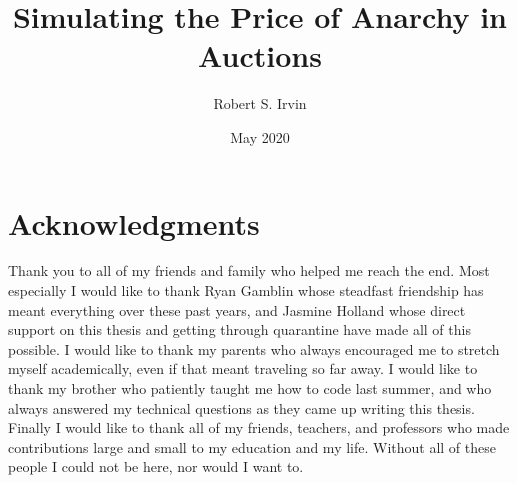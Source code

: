 \documentclass[12pt,twoside]{reedthesis}
\title{Simulating the Price of Anarchy in Auctions}
\author{Robert S. Irvin}
\date{May 2020}
\begin{document}
  \maketitle
  \frontmatter %
  \pagestyle{empty} %

    \chapter*{Acknowledgments}
	Thank you to all of my friends and family who helped me reach the end. Most especially I would like to thank Ryan Gamblin whose steadfast friendship has meant everything over these past years, and Jasmine Holland whose direct support on this thesis and getting through quarantine have made all of this possible. I would like to thank my parents who always encouraged me to stretch myself academically, even if that meant traveling so far away. I would like to thank my brother who patiently taught me how to code last summer, and who always answered my technical questions as they came up writing this thesis. Finally I would like to thank all of my friends, teachers, and professors who made contributions large and small to my education and my life. Without all of these people I could not be here, nor would I want to.

	
	
	

%
	
\end{document}
